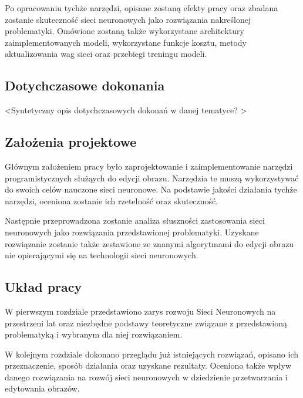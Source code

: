     Po opracowaniu tychże narzędzi, opisane zostaną efekty pracy oraz
    zbadana zostanie skuteczność sieci neuronowych jako rozwiązania nakreślonej
    problematyki. Omówione zostaną także wykorzystane architektury zaimplementowanych
    modeli, wykorzystane funkcje kosztu, metody aktualizowania wag sieci oraz
    przebiegi treningu modeli.

  \subsection{Dotychczasowe dokonania}
    \textless Syntetyczny opis dotychczasowych dokonań w danej tematyce?
    \textgreater

  \subsection{Założenia projektowe}
    Głównym założeniem pracy było zaprojektowanie i zaimplementowanie
    narzędzi programistycznych służąych do edycji obrazu. Narzędzia te muszą
    wykorzystywać do swoich celów nauczone sieci neuronowe. Na podstawie jakości
    działania tychże narzędzi, oceniona zostanie ich rzetelność oraz skuteczność.

    Następnie przeprowadzona zostanie analiza słuszności zastosowania sieci
    neuronowych jako rozwiązania przedstawionej problematyki. Uzyskane
    rozwiązanie zostanie także zestawione ze znanymi algorytmami do edycji
    obrazu nie opierającymi się na technologii sieci neuronowych.

  \subsection{Układ pracy}
    W pierwszym rozdziale przedstawiono zarys rozwoju Sieci Neuronowych
    na przestrzeni lat oraz niezbędne podstawy teoretyczne związane
    z przedstawioną problematyką i wybranym dla niej rozwiązaniem.

    W kolejnym rozdziale dokonano przeglądu już istniejących rozwiązań, opisano
    ich przeznaczenie, sposób działania oraz uzyskane rezultaty.
    Oceniono także wpływ danego rozwiązania na rozwój sieci neuronowych w
    dziedzienie przetwarzania i edytowania obrazów.
